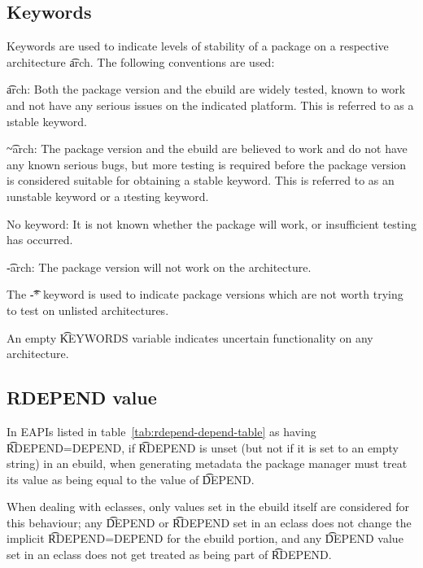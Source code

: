 \subsection{Keywords}
\label{sec:keywords}

Keywords are used to indicate levels of stability of a package on a respective architecture
\t{arch}. The following conventions are used:
\begin{compactitem}
\item \t{arch}: Both the package version and the ebuild are widely tested, known to work and not
    have any serious issues on the indicated platform. This is referred to as a \i{stable keyword}.
\item \t{\textasciitilde arch}: The package version and the ebuild are believed to work and do
    not have any known serious bugs, but more testing is required before the package version is
    considered suitable for obtaining a stable keyword. This is referred to as an \i{unstable
    keyword} or a \i{testing keyword}.
\item No keyword: It is not known whether the package will work, or insufficient testing has
    occurred.
\item \t{-arch}: The package version will not work on the architecture.
\end{compactitem}
The \t{-*} keyword is used to indicate package versions which are not worth trying to test on
unlisted architectures.

An empty \t{KEYWORDS} variable indicates uncertain functionality on any architecture.

\subsection{RDEPEND value}
\label{sec:rdepend-depend}

 In EAPIs listed in table~\ref{tab:rdepend-depend-table} as having
\t{RDEPEND=DEPEND}, if \t{RDEPEND} is unset (but not if it is set to an empty string) in an ebuild,
when generating metadata the package manager must treat its value as being equal to the value of
\t{DEPEND}.

When dealing with eclasses, only values set in the ebuild itself are considered for this behaviour;
any \t{DEPEND} or \t{RDEPEND} set in an eclass does not change the implicit \t{RDEPEND=DEPEND} for
the ebuild portion, and any \t{DEPEND} value set in an eclass does not get treated as being part of
\t{RDEPEND}.

